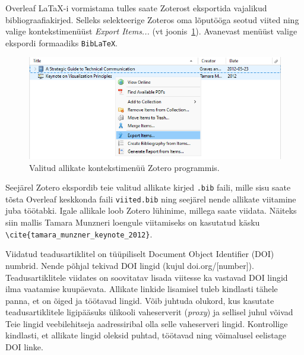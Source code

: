 Overleaf LaTaX-i vormistama tulles saate Zoterost eksportida vajalikud bibliograafiakirjed. Selleks selekteerige Zoteros oma lõputööga seotud viited ning valige kontekstimenüüst \emph{Export Items...} (vt joonis~\ref{fig:zoteroKontekst}). Avanevast menüüst valige ekspordi formaadiks \verb|BibLaTeX|.

\begin{figure}[htb!]
    \centering
    \captionsetup{justification=centering}
    \includegraphics[width=\textwidth]{figures/Joonis3-ZoteroBibliograafiaEksport.png}
    \caption{Valitud allikate kontekstimenüü Zotero programmis.}
    \label{fig:zoteroKontekst}
\end{figure}

Seejärel Zotero ekspordib teie valitud allikate kirjed \verb|.bib| faili, mille sisu saate tõsta Overleaf keskkonda faili \verb|viited.bib| ning seejärel nende allikate viitamine juba töötabki. Igale allikale loob Zotero lühinime, millega saate viidata. Näiteks siin mallis Tamara Munzneri loengule viitamiseks on kasutatud käsku \verb|\cite{tamara_munzner_keynote_2012}|.

Viidatud teadusartiklitel on tüüpiliselt Document Object Identifier (DOI) numbrid. Nende põhjal tekivad DOI lingid  (kujul doi.org/[number]). Teadusartiklitele viidates on soovitatav lisada viitesse ka vastavad DOI lingid ilma vaatamise kuupäevata. Allikate linkide lisamisel tuleb kindlasti tähele panna, et on õiged ja töötavad lingid. Võib juhtuda olukord, kus kasutate teadusartiklitele ligipääsuks ülikooli vaheserverit (\emph{proxy}) ja sellisel juhul võivad Teie lingid veebilehitseja aadressiribal olla selle vaheserveri lingid. Kontrollige kindlasti, et allikate lingid oleksid puhtad, töötavad ning võimalusel eelistage DOI linke.

